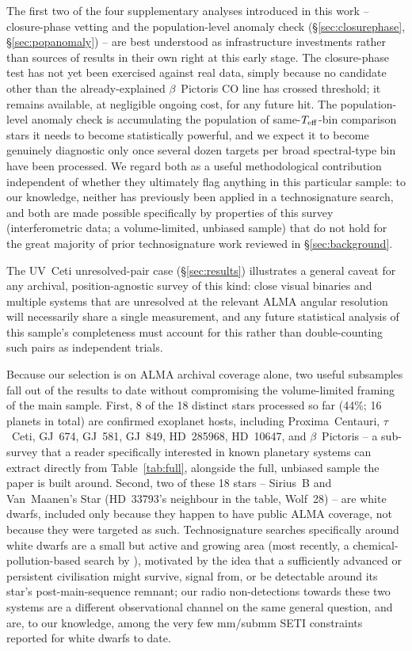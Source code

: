 \documentclass{openjournal}
\begin{document}
The first two of the four supplementary analyses introduced in this work
-- closure-phase vetting and the population-level anomaly check
(\S\ref{sec:closurephase}, \S\ref{sec:popanomaly}) -- are best understood
as infrastructure investments rather than sources of results in their
own right at this early stage. The closure-phase test has not yet been
exercised against real data, simply because no candidate other than the
already-explained $\beta$~Pictoris CO line has crossed threshold; it
remains available, at negligible ongoing cost, for any future hit. The
population-level anomaly check is accumulating the population of
same-$T_{\rm eff}$-bin comparison stars it needs to become statistically
powerful, and we expect it to become genuinely diagnostic only once
several dozen targets per broad spectral-type bin have been processed.
We regard both as a useful methodological contribution independent of
whether they ultimately flag anything in this particular sample: to our
knowledge, neither has previously been applied in a technosignature
search, and both are made possible specifically by properties of this
survey (interferometric data; a volume-limited, unbiased sample) that do
not hold for the great majority of prior technosignature work reviewed in
\S\ref{sec:background}.

The UV~Ceti unresolved-pair case (\S\ref{sec:results}) illustrates a
general caveat for any archival, position-agnostic survey of this kind:
close visual binaries and multiple systems that are unresolved at the
relevant ALMA angular resolution will necessarily share a single
measurement, and any future statistical analysis of this sample's
completeness must account for this rather than double-counting such
pairs as independent trials.

Because our selection is on ALMA archival coverage alone, two useful
subsamples fall out of the results to date without compromising the
volume-limited framing of the main sample. First, 8 of the 18 distinct
stars processed so far (44\%; 16 planets in total) are confirmed
exoplanet hosts, including Proxima~Centauri, $\tau$~Ceti, GJ~674,
GJ~581, GJ~849, HD~285968, HD~10647, and $\beta$~Pictoris -- a
sub-survey that a reader specifically interested in known planetary
systems can extract directly from Table~\ref{tab:full}, alongside the
full, unbiased sample the paper is built around. Second, two of these
18 stars -- Sirius~B and Van~Maanen's Star (HD~33793's neighbour in the
table, Wolf~28) -- are white dwarfs, included only because they happen
to have public ALMA coverage, not because they were targeted as such.
Technosignature searches specifically around white dwarfs are a small
but active and growing area (most recently, a chemical-pollution-based
search by \citealt{PollutedWD2026}), motivated by the idea that a
sufficiently advanced or persistent civilisation might survive, signal
from, or be detectable around its star's post-main-sequence remnant;
our radio non-detections towards these two systems are a different
observational channel on the same general question, and are, to our
knowledge, among the very few mm/submm SETI constraints reported for
white dwarfs to date.
\end{document}
